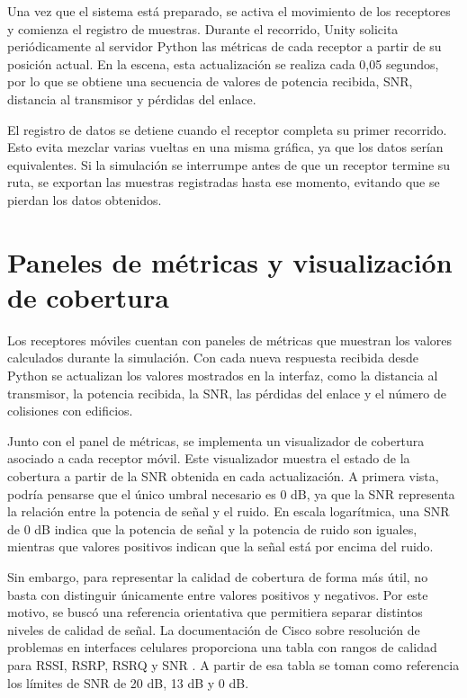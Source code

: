 Una vez que el sistema está preparado, se activa el movimiento de los receptores y comienza el registro de muestras. Durante el recorrido, Unity solicita periódicamente al servidor Python las métricas de cada receptor a partir de su posición actual. En la escena, esta actualización se realiza cada 0,05 segundos, por lo que se obtiene una secuencia de valores de potencia recibida, SNR, distancia al transmisor y pérdidas del enlace.

El registro de datos se detiene cuando el receptor completa su primer recorrido. Esto evita mezclar varias vueltas en una misma gráfica, ya que los datos serían equivalentes. Si la simulación se interrumpe antes de que un receptor termine su ruta, se exportan las muestras registradas hasta ese momento, evitando que se pierdan los datos obtenidos.

\section{Paneles de métricas y visualización de cobertura}

Los receptores móviles cuentan con paneles de métricas que muestran los valores calculados durante la simulación. Con cada nueva respuesta recibida desde Python se actualizan los valores mostrados en la interfaz, como la distancia al transmisor, la potencia recibida, la SNR, las pérdidas del enlace y el número de colisiones con edificios.

Junto con el panel de métricas, se implementa un visualizador de cobertura asociado a cada receptor móvil. Este visualizador muestra el estado de la cobertura a partir de la SNR obtenida en cada actualización. A primera vista, podría pensarse que el único umbral necesario es 0 dB, ya que la SNR representa la relación entre la potencia de señal y el ruido. En escala logarítmica, una SNR de 0 dB indica que la potencia de señal y la potencia de ruido son iguales, mientras que valores positivos indican que la señal está por encima del ruido.

Sin embargo, para representar la calidad de cobertura de forma más útil, no basta con distinguir únicamente entre valores positivos y negativos. Por este motivo, se buscó una referencia orientativa que permitiera separar distintos niveles de calidad de señal. La documentación de Cisco sobre resolución de problemas en interfaces celulares proporciona una tabla con rangos de calidad para RSSI, RSRP, RSRQ y SNR \cite{cisco_troubleshooting_cellular}. A partir de esa tabla se toman como referencia los límites de SNR de 20 dB, 13 dB y 0 dB.

